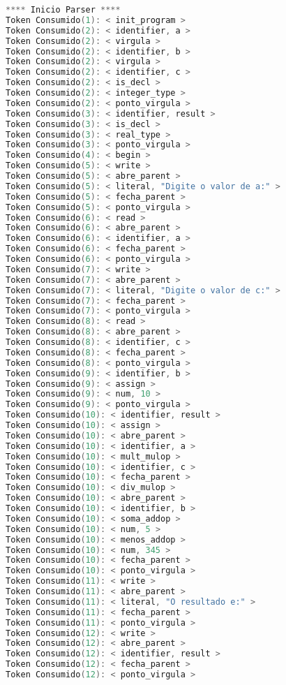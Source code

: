 \begin{lstlisting}[caption={Saida Correta para o Codigo de teste  : Teste1.txt},label={Entrada 1},language=C]
**** Inicio Parser ****
Token Consumido(1): < init_program >
Token Consumido(2): < identifier, a >
Token Consumido(2): < virgula >
Token Consumido(2): < identifier, b >
Token Consumido(2): < virgula >
Token Consumido(2): < identifier, c >
Token Consumido(2): < is_decl >
Token Consumido(2): < integer_type >
Token Consumido(2): < ponto_virgula >
Token Consumido(3): < identifier, result >
Token Consumido(3): < is_decl >
Token Consumido(3): < real_type >
Token Consumido(3): < ponto_virgula >
Token Consumido(4): < begin >
Token Consumido(5): < write >
Token Consumido(5): < abre_parent >
Token Consumido(5): < literal, "Digite o valor de a:" >
Token Consumido(5): < fecha_parent >
Token Consumido(5): < ponto_virgula >
Token Consumido(6): < read >
Token Consumido(6): < abre_parent >
Token Consumido(6): < identifier, a >
Token Consumido(6): < fecha_parent >
Token Consumido(6): < ponto_virgula >
Token Consumido(7): < write >
Token Consumido(7): < abre_parent >
Token Consumido(7): < literal, "Digite o valor de c:" >
Token Consumido(7): < fecha_parent >
Token Consumido(7): < ponto_virgula >
Token Consumido(8): < read >
Token Consumido(8): < abre_parent >
Token Consumido(8): < identifier, c >
Token Consumido(8): < fecha_parent >
Token Consumido(8): < ponto_virgula >
Token Consumido(9): < identifier, b >
Token Consumido(9): < assign >
Token Consumido(9): < num, 10 >
Token Consumido(9): < ponto_virgula >
Token Consumido(10): < identifier, result >
Token Consumido(10): < assign >
Token Consumido(10): < abre_parent >
Token Consumido(10): < identifier, a >
Token Consumido(10): < mult_mulop >
Token Consumido(10): < identifier, c >
Token Consumido(10): < fecha_parent >
Token Consumido(10): < div_mulop >
Token Consumido(10): < abre_parent >
Token Consumido(10): < identifier, b >
Token Consumido(10): < soma_addop >
Token Consumido(10): < num, 5 >
Token Consumido(10): < menos_addop >
Token Consumido(10): < num, 345 >
Token Consumido(10): < fecha_parent >
Token Consumido(10): < ponto_virgula >
Token Consumido(11): < write >
Token Consumido(11): < abre_parent >
Token Consumido(11): < literal, "O resultado e:" >
Token Consumido(11): < fecha_parent >
Token Consumido(11): < ponto_virgula >
Token Consumido(12): < write >
Token Consumido(12): < abre_parent >
Token Consumido(12): < identifier, result >
Token Consumido(12): < fecha_parent >
Token Consumido(12): < ponto_virgula >



\end{lstlisting}\newline




